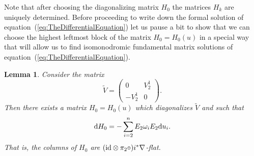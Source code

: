 \documentclass[10pt,a4paper]{amsart}
\numberwithin{equation}{section}
\newtheorem{Lemma}[Theorem]{Lemma}
\begin{document}
 Note that after choosing the diagonalizing matrix $H_{0}$ the matrices $H_{k}$ are uniquely determined. Before proceeding to write down the formal solution of equation~(\ref{eq:TheDifferentialEquation}) let us pause a bit to show that we can choose the highest leftmost block of the matrix $H_{0}=H_{0}(u)$ in a special way that will allow us to find isomonodromic fundamental matrix solutions of equation~(\ref{eq:TheDifferentialEquation}).
 \begin{Lemma}
 \label{lem:DiagonalizingV}
 Consider the matrix
 \begin{equation*}
 \tilde{V}=\begin{pmatrix}
 0 & V^{1}_{2}\\
 -V^{1}_{2}&0
 \end{pmatrix}.
 \end{equation*}
 Then there exists a matrix $H_{0}=H_{0}(u)$ which diagonalizes $\tilde{V}$ and such that
 \begin{equation*}
 {\rm d}H_{0}=-\sum_{i=2}^{n}E_{2}\omega_{i}E_{2}{\rm d}u_{i}.
 \end{equation*}
 That is, the columns of $H_{0}$ are $({\rm id}\otimes\pi_{2}\circ)i^{*}\nabla$-flat.
 \end{Lemma}
\end{document}
